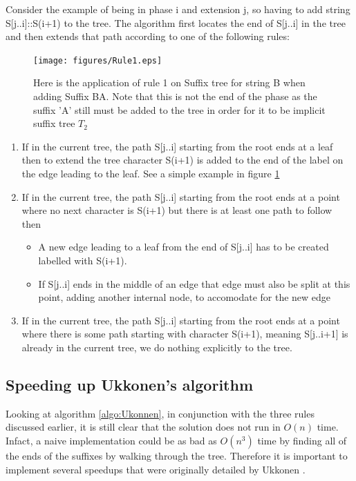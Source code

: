 \documentclass[12pt,twoside,notitlepage]{report}
\begin{document}
				Consider the example of being in phase i and extension j, so having to add string S[j..i]::S(i+1) to the tree. The algorithm first locates the end of S[j..i] in the tree and then extends that path according to one of the following rules:
				\begin{figure}[h]
			\centerline{\texttt{[image: figures/Rule1.eps]}}
			\caption{\label{fig:rule1} Here is the application of rule 1 on Suffix tree for string B when adding Suffix BA. Note that this is not the end of the phase as the suffix 'A' still must be added to the tree in order for it to be implicit suffix tree $T_2$}
\end{figure}
					\begin{enumerate}
						\item{If in the current tree, the path S[j..i] starting from the root ends at a leaf then to extend the tree character S(i+1) is added to the end of the label on the edge leading to the leaf. See a simple example in figure \ref{fig:rule1}}
						\item{If in the current tree, the path S[j..i] starting from the root ends at a point where no next character is S(i+1) but there is at least one path to follow then}
							\begin{itemize}
								\item{A new edge leading to a leaf from the end of S[j..i] has to be created labelled with S(i+1).}
								\item{If S[j..i] ends in the middle of an edge that edge must also be split at this point, adding another internal node, to accomodate for the new edge}
							\end{itemize}
						\item{If in the current tree, the path S[j..i] starting from the root ends at a point where there is some path starting with character S(i+1), meaning S[j..i+1] is already in the current tree, we do nothing explicitly to the tree.}
					\end{enumerate}
					
					
			\subsection{Speeding up Ukkonen's algorithm}
				
					Looking at algorithm \ref{algo:Ukonnen}, in conjunction with the three rules discussed earlier, it is still clear that the solution does not run in $O(n)$ time. Infact, a naive implementation could be as bad as $O(n^3)$ time by finding all of the ends of the suffixes by walking through the tree. Therefore it is important to implement several speedups that were originally detailed by Ukkonen \cite{Ukkonen1995}.
					
\end{document}
